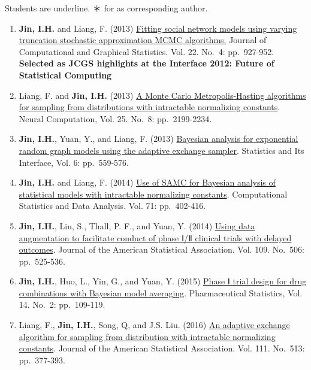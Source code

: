 \documentclass[
]{book}
\begin{document}
Students are underline. ＊ for as corresponding author.

\begin{enumerate}
\def\labelenumi{\arabic{enumi}.}
\item
  \textbf{Jin, I.H.} and Liang, F. (2013) \href{https://www.researchgate.net/publication/241724330_Fitting_Social_Network_Models_Using_Varying_Truncation_Stochastic_Approximation_MCMC_Algorithm}{Fitting social network models using varying truncation stochastic approximation MCMC algorithms.} Journal of Computational and Graphical Statistics. Vol. 22. No.~4: pp.~927-952. \textbf{Selected as JCGS highlights at the Interface 2012: Future of Statistical Computing}
\item
  Liang, F. and \textbf{Jin, I.H.} (2013) \href{https://www.researchgate.net/publication/236264661_A_Monte_Carlo_Metropolis-Hastings_Algorithm_for_Sampling_from_Distributions_with_Intractable_Normalizing_Constants}{A Monte Carlo Metropolis-Hasting algorithms for sampling from distributions with intractable normalizing constants}. Neural Computation, Vol. 25. No.~8: pp.~2199-2234.
\item
  \textbf{Jin, I.H.}, Yuan, Y., and Liang, F. (2013) \href{https://www.researchgate.net/publication/260999601_Bayesian_Analysis_for_Exponential_Random_Graph_Models_Using_the_Adaptive_Exchange_Sampler}{Bayesian analysis for exponential random graph models using the adaptive exchange sampler}. Statistics and Its Interface, Vol. 6: pp.~559-576.
\item
  \textbf{Jin, I.H.} and Liang, F. (2014) \href{https://www.researchgate.net/publication/228682695_Use_of_SAMC_for_Bayesian_Analysis_of_Statistical_Models_with_Intractable_Normalizing_Constants}{Use of SAMC for Bayesian analysis of statistical models with intractable normalizing constants}. Computational Statistics and Data Analysis. Vol. 71: pp.~402-416.
\item
  \textbf{Jin, I.H.}, Liu, S., Thall, P. F., and Yuan, Y. (2014) \href{https://pubmed.ncbi.nlm.nih.gov/25382884/}{Using data augmentation to facilitate conduct of phase Ⅰ/Ⅱ clinical trials with delayed outcomes}. Journal of the American Statistical Association. Vol. 109. No.~506: pp.~525-536.
\item
  \textbf{Jin, I.H.}, Huo, L., Yin, G., and Yuan, Y. (2015) \href{https://pubmed.ncbi.nlm.nih.gov/25641851/}{Phase Ⅰ trial design for drug combinations with Bayesian model averaging}. Pharmaceutical Statistics, Vol. 14. No.~2: pp.~109-119.
\item
  Liang, F., \textbf{Jin, I.H.}, Song, Q, and J.S. Liu. (2016) \href{https://www.researchgate.net/publication/272376704_An_Adaptive_Exchange_Algorithm_for_Sampling_From_Distributions_With_Intractable_Normalizing_Constants}{An adaptive exchange algorithm for sampling from distribution with intractable normalizing constants}. Journal of the American Statistical Association. Vol. 111. No.~513: pp.~377-393.

\end{enumerate}
\end{document}

